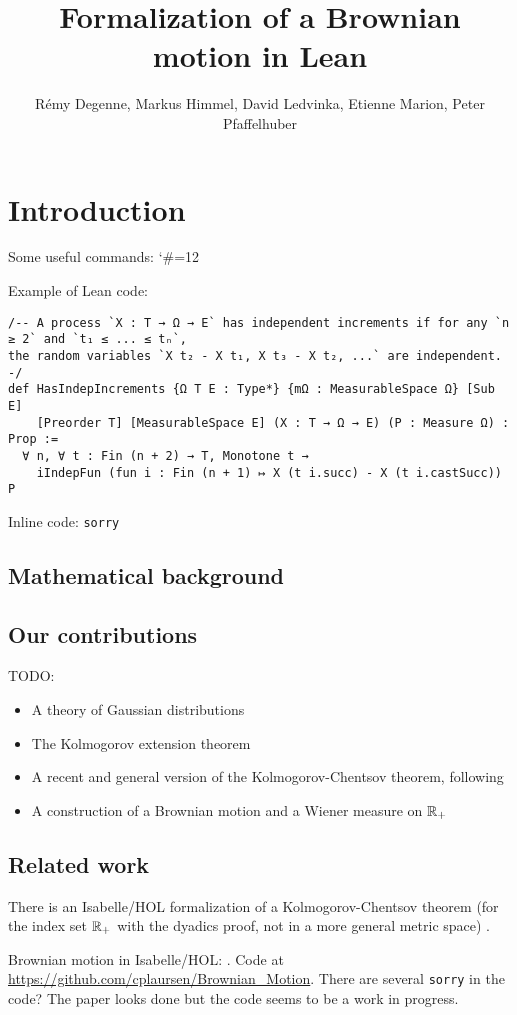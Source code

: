 \documentclass[lean]{DraftAFM}
\title[Formalization of a Brownian motion in Lean]{Formalization of a Brownian motion in Lean}
\author[R. Degenne, M. Himmel, D. Ledvinka, E. Marion, P. Pfaffelhuber]{
  Rémy Degenne, Markus Himmel, David Ledvinka, Etienne Marion, Peter Pfaffelhuber}
\makeatletter
\newcommand\leanlink{\begingroup\catcode`\#=12\relax\@leanlink}
\newcommand\@leanlink[2]{\endgroup
\href{#1}
{\texttt{\detokenize{#2}}}}
\makeatother
\begin{document}
\section{Introduction}

Some useful commands:
\mathlib{}
\Lean{}
\leanlink{url}{this is a link to Lean code}

Example of Lean code:
\begin{lstlisting}
/-- A process `X : T → Ω → E` has independent increments if for any `n ≥ 2` and `t₁ ≤ ... ≤ tₙ`,
the random variables `X t₂ - X t₁, X t₃ - X t₂, ...` are independent. -/
def HasIndepIncrements {Ω T E : Type*} {mΩ : MeasurableSpace Ω} [Sub E]
    [Preorder T] [MeasurableSpace E] (X : T → Ω → E) (P : Measure Ω) : Prop :=
  ∀ n, ∀ t : Fin (n + 2) → T, Monotone t →
    iIndepFun (fun i : Fin (n + 1) ↦ X (t i.succ) - X (t i.castSucc)) P
\end{lstlisting}

Inline code: \lstinline|sorry|

\subsection{Mathematical background}


\subsection{Our contributions}

TODO:
\begin{itemize}
  \item A theory of Gaussian distributions
  \item The Kolmogorov extension theorem
  \item A recent and general version of the Kolmogorov-Chentsov theorem, following \cite{kratschmer2023kolmogorov}
  \item A construction of a Brownian motion and a Wiener measure on $\mathbb{R}_+$
\end{itemize}

\subsection{Related work}

There is an Isabelle/HOL formalization of a Kolmogorov-Chentsov theorem (for the index set $\mathbb{R}_+$ with the dyadics proof, not in a more general metric space) \cite{Kolmogorov_Chentsov-AFP}.

Brownian motion in Isabelle/HOL: \cite{laursen2024brownian}.
Code at \href{https://github.com/cplaursen/Brownian_Motion}{https://github.com/cplaursen/Brownian\_Motion}. There are several \lstinline|sorry| in the code? The paper looks done but the code seems to be a work in progress.
\end{document}
